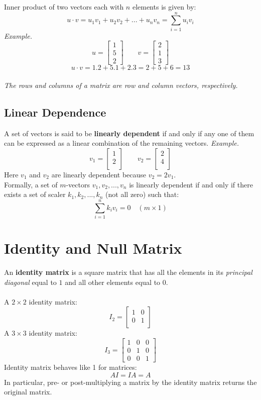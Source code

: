 \documentclass{./../../latex/handout}
\begin{document}
Inner product of two vectors each with $n$ elements is given by:
\[ u \cdot v = u_1 v_1 + u_2 v_2 +...+ u_n v_n = \sum_{i=1}^n u_i v_i \] 
\textit{Example.} \[u = \begin{bmatrix} 1 \\ 5 \\ 2 \end{bmatrix} \quad \quad v = \begin{bmatrix} 2 \\ 1 \\ 3 \end{bmatrix}\]
\[ u \cdot v = 1.2 + 5.1 + 2.3 = 2+5+6=13 \] \\
\textit{The rows and columns of a matrix are row and column vectors, respectively.}  

\subsection{Linear Dependence}

A set of vectors is said to be \textbf{linearly dependent} if and only if any one of them can be expressed as a linear combination of the remaining vectors. \vspace{1em}
\textit{Example.}\[ v_1 =  \begin{bmatrix}
1\\
2 \\
\end{bmatrix} \quad \quad v_2 = \begin{bmatrix}
2\\
4 \\
\end{bmatrix}\]
Here $v_1$ and $v_2$ are linearly dependent because $v_2=2 v_1$.\\

Formally, a set of $m$-vectors $v_1, v_2, ...,v_n$ is {linearly dependent} if and only if there exists a set of scaler $k_1, k_2, ..., k_n$ (not all zero) such that:
\[ \sum_{i=1}^n k_i v_i = 0 \quad (m \times 1) \] 


\section{Identity and Null Matrix}
An \textbf{identity matrix} is a square matrix that has all the elements in its \textit{principal diagonal} equal to $1$ and all other elements equal to $0$. \\~\\
A $2 \times 2$ identity matrix:
\[ I_2 = \begin{bmatrix}
1 & 0\\
0 & 1 \\
\end{bmatrix}\]
A $3 \times 3$ identity matrix:
\[ I_3 = \begin{bmatrix}
1 & 0 & 0 \\
0 & 1 & 0\\
0 & 0 & 1
\end{bmatrix}\]
Identity matrix behaves like 1 for matrices:
\[ AI = IA = A \] 
In particular, pre- or post-multiplying a matrix by the identity matrix returns the original matrix.
\end{document}
